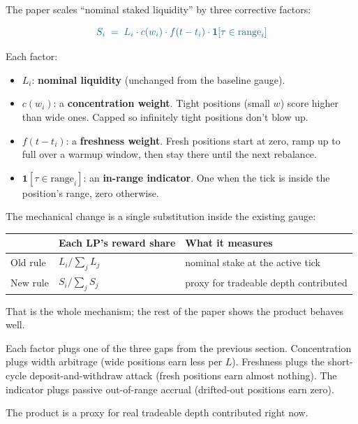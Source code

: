 \documentclass[11pt,a4paper]{article}
\begin{document}
The paper scales ``nominal staked liquidity'' by three corrective factors:

\begin{result}
\[
\textcolor{ikey}{\;S_i \;=\; L_i \cdot c(w_i) \cdot f(t - t_i) \cdot \mathbf{1}[\tau \in \text{range}_i]\;}
\]
\end{result}

Each factor:

\begin{itemize}[leftmargin=2em]
\item $L_i$: \textbf{nominal liquidity} (unchanged from the baseline gauge).
\item $c(w_i)$: a \textbf{concentration weight}. Tight positions (small $w$) score higher than wide ones. Capped so infinitely tight positions don't blow up.
\item $f(t - t_i)$: a \textbf{freshness weight}. Fresh positions start at zero, ramp up to full over a warmup window, then stay there until the next rebalance.
\item $\mathbf{1}[\tau \in \text{range}_i]$: an \textbf{in-range indicator}. One when the tick is inside the position's range, zero otherwise.
\end{itemize}

The mechanical change is a single substitution inside the existing gauge:

\begin{center}
\small
\begin{tabular}{@{}lll@{}}
\toprule
 & Each LP's reward share & What it measures \\
\midrule
Old rule & $L_i / \sum_j L_j$ & nominal stake at the active tick \\
New rule & $S_i / \sum_j S_j$ & proxy for tradeable depth contributed \\
\bottomrule
\end{tabular}
\end{center}

That is the whole mechanism; the rest of the paper shows the product behaves well.

\begin{intuition}
Each factor plugs one of the three gaps from the previous section. Concentration plugs width arbitrage (wide positions earn less per $L$). Freshness plugs the short-cycle deposit-and-withdraw attack (fresh positions earn almost nothing). The indicator plugs passive out-of-range accrual (drifted-out positions earn zero).

The product is a proxy for real tradeable depth contributed right now.
\end{intuition}
\end{document}
